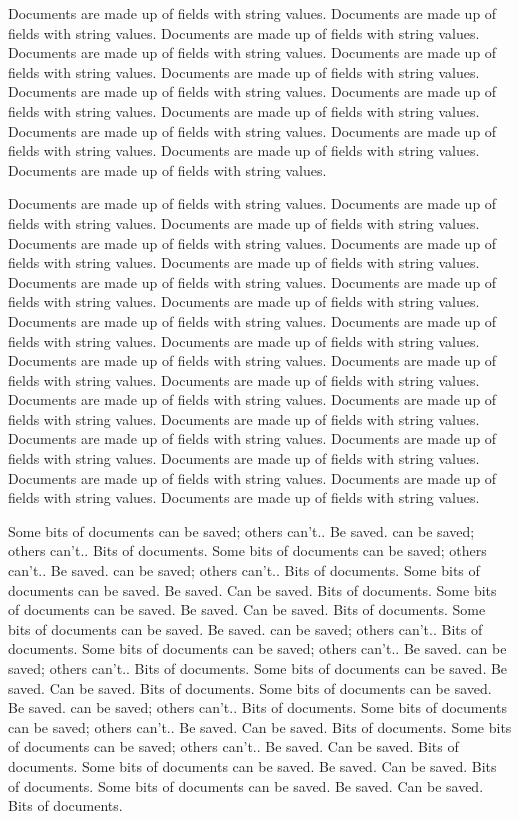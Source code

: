 Documents are made up of fields with string values.
Documents are made up of fields with string values.
Documents are made up of fields with string values.
Documents are made up of fields with string values.
Documents are made up of fields with string values.
Documents are made up of fields with string values.
Documents are made up of fields with string values.
Documents are made up of fields with string values.
Documents are made up of fields with string values.
Documents are made up of fields with string values.
Documents are made up of fields with string values.
Documents are made up of fields with string values.
Documents are made up of fields with string values.


Documents are made up of fields with string values.
Documents are made up of fields with string values.
Documents are made up of fields with string values.
Documents are made up of fields with string values.
Documents are made up of fields with string values.
Documents are made up of fields with string values.
Documents are made up of fields with string values.
Documents are made up of fields with string values.
Documents are made up of fields with string values.
Documents are made up of fields with string values.
Documents are made up of fields with string values.
Documents are made up of fields with string values.
Documents are made up of fields with string values.
Documents are made up of fields with string values.
Documents are made up of fields with string values.
Documents are made up of fields with string values.
Documents are made up of fields with string values.
Documents are made up of fields with string values.
Documents are made up of fields with string values.
Documents are made up of fields with string values.
Documents are made up of fields with string values.
Documents are made up of fields with string values.
Documents are made up of fields with string values.
Documents are made up of fields with string values.

Some bits of documents can be saved; others can't..  Be saved.
can be saved; others can't..  Bits of documents.
Some bits of documents can be saved; others can't..  Be saved.
can be saved; others can't..  Bits of documents.
Some bits of documents can be saved.  Be saved.
Can be saved.  Bits of documents.
Some bits of documents can be saved.  Be saved.
Can be saved.  Bits of documents.
Some bits of documents can be saved.  Be saved.
can be saved; others can't..  Bits of documents.
Some bits of documents can be saved; others can't..  Be saved.
can be saved; others can't..  Bits of documents.
Some bits of documents can be saved.  Be saved.
Can be saved.  Bits of documents.
Some bits of documents can be saved.  Be saved.
can be saved; others can't..  Bits of documents.
Some bits of documents can be saved; others can't..  Be saved.
Can be saved.  Bits of documents.
Some bits of documents can be saved; others can't..  Be saved.
Can be saved.  Bits of documents.
Some bits of documents can be saved.  Be saved.
Can be saved.  Bits of documents.
Some bits of documents can be saved.  Be saved.
Can be saved.  Bits of documents.

